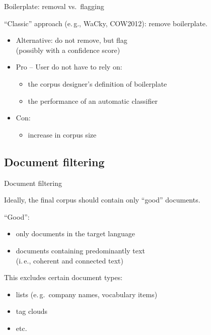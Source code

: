 \begin{frame}{Boilerplate: removal vs.\ flagging}
  
``Classic'' approach (e.\,g., WaCky, COW2012): remove boilerplate.

  \begin{itemize}
  \item Alternative: do not remove, but flag\\
    (possibly with a confidence score)
    \item \alert{Pro} -- User do not have to rely on:
      \begin{itemize}
      \item the corpus designer's definition of boilerplate
      \item the performance of an automatic classifier
      \end{itemize}
\pause
    \item \alert{Con}:
      \begin{itemize}
      \item increase in corpus size
      \end{itemize}
  \end{itemize}
\end{frame}


\subsection{Document filtering}


\begin{frame}
{Document filtering}

Ideally, the final corpus should contain only ``good'' documents.

``Good'':

\begin{itemize}
\item only documents in the target language
\item documents containing predominantly text\\
  (i.\,e., coherent and connected text)
\end{itemize}

\pause

This excludes certain document types:

\begin{itemize}
\item lists (e.\,g.\ company names, vocabulary items)
\item tag clouds
\item etc.
\end{itemize}

\end{frame}



